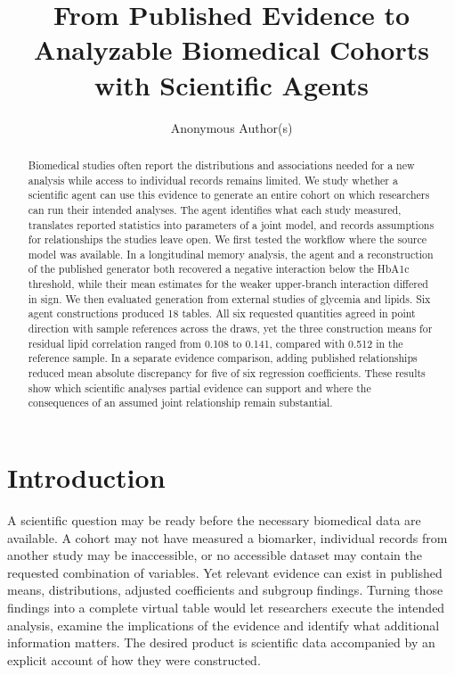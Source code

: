 \documentclass[sigconf,anonymous,review]{acmart}
\begin{document}
\title{From Published Evidence to Analyzable Biomedical Cohorts with Scientific Agents}
\author{Anonymous Author(s)}
\begin{abstract}

Biomedical studies often report the distributions and associations needed for a new analysis while access to individual records remains limited. We study whether a scientific agent can use this evidence to generate an entire cohort on which researchers can run their intended analyses. The agent identifies what each study measured, translates reported statistics into parameters of a joint model, and records assumptions for relationships the studies leave open. We first tested the workflow where the source model was available. In a longitudinal memory analysis, the agent and a reconstruction of the published generator both recovered a negative interaction below the HbA1c threshold, while their mean estimates for the weaker upper-branch interaction differed in sign. We then evaluated generation from external studies of glycemia and lipids. Six agent constructions produced 18 tables. All six requested quantities agreed in point direction with sample references across the draws, yet the three construction means for residual lipid correlation ranged from 0.108 to 0.141, compared with 0.512 in the reference sample. In a separate evidence comparison, adding published relationships reduced mean absolute discrepancy for five of six regression coefficients. These results show which scientific analyses partial evidence can support and where the consequences of an assumed joint relationship remain substantial.

\end{abstract}

\maketitle

\section{Introduction}

A scientific question may be ready before the necessary biomedical data are available. A cohort may not have measured a biomarker, individual records from another study may be inaccessible, or no accessible dataset may contain the requested combination of variables. Yet relevant evidence can exist in published means, distributions, adjusted coefficients and subgroup findings. Turning those findings into a complete virtual table would let researchers execute the intended analysis, examine the implications of the evidence and identify what additional information matters. The desired product is scientific data accompanied by an explicit account of how they were constructed.
\end{document}
